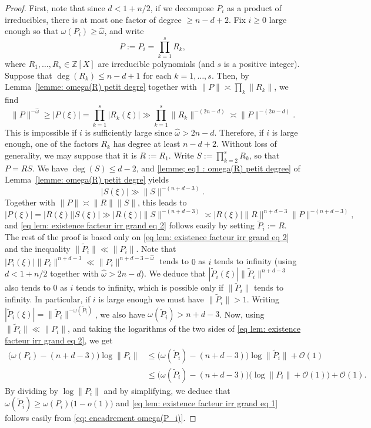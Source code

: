 \documentclass[10pt,a4paper]{amsart}
\numberwithin{equation}{section}
\newcommand\bZ{\mathbb{Z}}
\newcommand\tP{\widetilde{P}}
\newcommand\GrO{\mathcal{O}}
\newcommand\homega{\widehat{\omega}}\newcommand\HH{\mathcal{H}}
\newcommand{\normH}[1]{\|#1\|}
\theoremstyle{definition}
\theoremstyle{plain}
\begin{document}
\begin{proof}
First, note that since $d < 1+n/2$, if we decompose $P_i$ as a product of irreducibles, there is at most one factor of degree $\geq n-d+2$. Fix $i\geq 0$ large enough so that $\omega(P_i) \geq \homega$, and write
\[
P:=P_i = \prod_{k=1}^s R_k,
\]
where $R_1,\dots,R_s\in\bZ[X]$ are irreducible polynomials (and $s$ is a positive integer). Suppose that $\deg(R_k) \leq n-d+1$ for each $k=1,\dots,s$. Then, by Lemma~\ref{lemme: omega(R) petit degre} together with $\normH{P} \asymp \prod_k \normH{R_k}$, we find
\begin{equation*}
\normH{P}^{-\homega}\geq |P(\xi)| = \prod_{k=1}^{s} |R_k(\xi)| \gg \prod_{k=1}^{s} \normH{R_k}^{-(2n-d)} \asymp \normH{P}^{-(2n-d)}.
\end{equation*}
This is impossible if $i$ is sufficiently large since $\homega > 2n-d$. Therefore, if $i$ is large enough, one of the factors $R_k$ has degree at least $n-d+2$. Without loss of generality, we may suppose that it is $R:=R_1$.
Write $S:= \prod_{k = 2}^{s} R_k$, so that $P=RS$. We have $\deg(S) \leq d-2$, and \eqref{lemme; eq1 : omega(R) petit degree} of Lemma~\ref{lemme: omega(R) petit degre} yields
\begin{equation*}
|S(\xi)| \gg \normH{S}^{-(n+d-3)}.
\end{equation*}
Together with $\normH{P}\asymp \normH{R}\normH{S}$, this leads to
\begin{equation*}
|P(\xi)| = |R(\xi)||S(\xi)| \gg |R(\xi)|\normH{S}^{-(n+d-3)} \asymp |R(\xi)|\normH{R}^{n+d-3}\normH{P}^{-(n+d-3)},
\end{equation*}
and \eqref{eq lem: existence facteur irr grand eq 2} follows easily by setting $\tP_i:=R$. The rest of the proof is based only on \eqref{eq lem: existence facteur irr grand eq 2} and the inequality $\normH{\tP_i} \ll \normH{P_i}$. Note that $|P_i(\xi)|\normH{P_i}^{n+d-3} \ll \normH{P_i}^{n+d-3-\homega}$ tends to $0$ as $i$ tends to infinity (using $d < 1+n/2$ together with $\homega > 2n-d$). We deduce that $|\tP_i(\xi)|\normH{\tP_i}^{n+d-3}$ also tends to $0$ as $i$ tends to infinity, which is possible only if $\normH{\tP_i}$ tends to infinity. In particular, if $i$ is large enough we must have $\normH{\tP_i} > 1$. Writing $|\tP_i(\xi)| = \normH{\tP_i}^{-\omega(\tP_i)}$, we also have $\omega(\tP_i) > n+d-3$. Now, using $\normH{\tP_i}\ll \normH{P_i}$, and taking the logarithms of the two sides of \eqref{eq lem: existence facteur irr grand eq 2}, we get
\begin{align*}
\big(\omega(P_i)-(n+d-3)\big)\log \normH{P_i} & \leq \big(\omega(\tP_i)-(n+d-3)\big)\log \normH{\tP_i} + \GrO(1) \\
& \leq \big(\omega(\tP_i)-(n+d-3)\big)\big(\log \normH{P_i}+\GrO(1)\big) + \GrO(1).
\end{align*}
By dividing by $\log \normH{P_i}$ and by simplifying, we deduce that $\omega(\tP_i) \geq \omega(P_i)\big (1 - o(1)\big)$ and \eqref{eq lem: existence facteur irr grand eq 1} follows easily from \eqref{eq: encadrement omega(P_i)}.
\end{proof}
\end{document}
